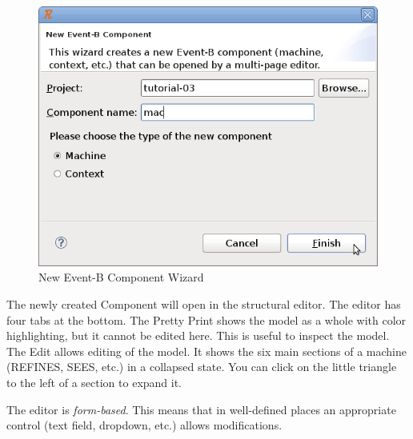 \begin{figure}[!h]
\begin{center}
	\includegraphics[]{img/tutorial/tut_03_mac.png}
	\caption{New Event-B Component Wizard}
	\label{fig_tut_03_new_component_wizard}
\end{center}
\end{figure}

The newly created Component will open in the structural editor.  The editor has four tabs at the bottom.  The \textsf{Pretty Print} shows the model as a whole with color highlighting, but it cannot be edited here.  This is useful to inspect the model.  The \textsf{Edit} allows editing of the model.  It shows the six main sections of a machine (REFINES, SEES, etc.) in a collapsed state.  You can click on the little triangle to the left of a section to expand it.


The editor is \textit{form-based}.  This means that in well-defined places an appropriate control (text field, dropdown, etc.) allows modifications.


